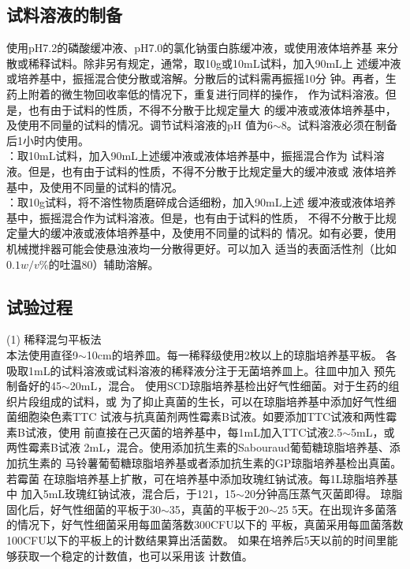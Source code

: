 \documentclass[11pt,a4paper]{article}
\newenvironment{SC}{%
  \CJKfamily{gbsn}%
  \CJKtilde
  \CJKnospace}{}
\begin{document}
\begin{CJK}{UTF8}{}
\begin{SC}
\subsection*{试料溶液的制备}
使用pH7.2的磷酸缓冲液、pH7.0的氯化钠蛋白胨缓冲液，或使用液体培养基
来分散或稀释试料。除非另有规定，通常，取10g或10mL试料，加入90mL上
述缓冲液或培养基中，振摇混合使分散或溶解。分散后的试料需再振摇10分
钟。再者，生药上附着的微生物回收率低的情况下，重复进行同样的操作，
作为试料溶液。但是，也有由于试料的性质，不得不分散于比规定量大
的缓冲液或液体培养基中，及使用不同量的试料的情况。调节试料溶液的pH
值为6$\sim$8。试料溶液必须在制备后1小时内使用。\\
：取10mL试料，加入90mL上述缓冲液或液体培养基中，振摇混合作为
试料溶液。但是，也有由于试料的性质，不得不分散于比规定量大的缓冲液或
液体培养基中，及使用不同量的试料的情况。\\
：取10g试料，将不溶性物质磨碎成合适细粉，加入90mL上述
缓冲液或液体培养基中，振摇混合作为试料溶液。但是，也有由于试料的性质，
不得不分散于比规定量大的缓冲液或液体培养基中，及使用不同量的试料的
情况。如有必要，使用机械搅拌器可能会使悬浊液均一分散得更好。可以加入
适当的表面活性剂（比如$0.1w/v\%$的吐温80）辅助溶解。\\

\subsection*{试验过程}

(1) 稀释混匀平板法\\
本法使用直径9$\sim$10cm的培养皿。每一稀释级使用2枚以上的琼脂培养基平板。
各吸取1mL的试料溶液或试料溶液的稀释液分注于无菌培养皿上。往皿中加入
预先制备好的45$\sim$20mL，混合。
使用SCD琼脂培养基检出好气性细菌。对于生药的组织片段组成的试料，或
为了抑止真菌的生长，可以在琼脂培养基中添加好气性细菌细胞染色素TTC
试液与抗真菌剂两性霉素B试液。如要添加TTC试液和两性霉素B试液，使用
前直接在己灭菌的培养基中，每1mL加入TTC试液2.5$\sim$5mL，或两性霉素B试液
2mL，混合。使用添加抗生素的Sabouraud葡萄糖琼脂培养基、添加抗生素的
马铃薯葡萄糖琼脂培养基或者添加抗生素的GP琼脂培养基检出真菌。若霉菌
在琼脂培养基上扩散，可在培养基中添加玫瑰红钠试液。每1L琼脂培养基中
加入5mL玫瑰红钠试液，混合后，于121\textcelsius，15$\sim$20分钟高压蒸气灭菌即得。
琼脂固化后，好气性细菌的平板于30$\sim$35\textcelsius，真菌的平板于20$\sim$25
5天。在出现许多菌落的情况下，好气性细菌采用每皿菌落数300CFU以下的
平板，真菌采用每皿菌落数100CFU以下的平板上的计数结果算出活菌数。
如果在培养后5天以前的时间里能够获取一个稳定的计数值，也可以采用该
计数值。\\


\end{SC}
\end{CJK}
\end{document}
